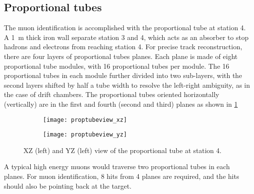 \documentclass[../main.tex]{subfiles}
\begin{document}
\subsection{Proportional tubes}
The muon identification is accomplished with the proportional tube at station 4. A \SI{1}{\meter} thick
iron wall separate station 3 and 4, which acts as an absorber to stop hadrons and electrons from reaching
station 4. For precise track reconstruction, there are four layers of proportional tubes planes. Each plane
is made of eight proportional tube modules, with 16 proportional tubes per module. The 16 proportional tubes
in each module further divided into two sub-layers, with the second layers shifted by half a tube width to
resolve the left-right ambiguity, as in the case of drift chambers. The proportional tubes oriented horizontally
(vertically) are in the first and fourth (second and third) planes as shown in \cref{fig:prop}
\begin{figure}[ht!]
	\centering
	\begin{subfigure}{0.45\linewidth}
		\texttt{[image: proptubeview\_xz]}
	\end{subfigure}
	\begin{subfigure}{0.45\linewidth}
		\texttt{[image: proptubeview\_yz]}
	\end{subfigure}
	\caption{XZ (left) and YZ (left) view of the proportional tube at station 4.}
	\label{fig:prop}
\end{figure}
A typical high energy muons would traverse two proportional tubes in each planes.
For muon identification, 8 hits from 4 planes are required, and the hits
should also be pointing back at the target.
\end{document}
